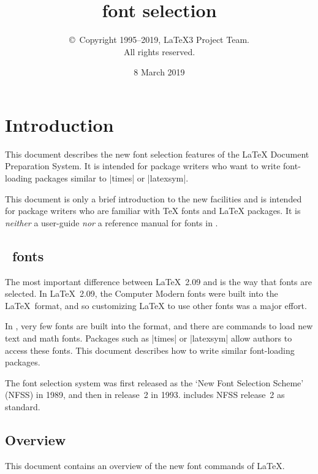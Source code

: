 \documentclass{ltxguide}[1995/11/28]
\title{\LaTeXe{} font selection}
\author{\copyright~Copyright 1995--2019, \LaTeX3 Project Team.\\
   All rights reserved.}
\date{8 March 2019}
\begin{document}
 
\maketitle
 
\tableofcontents
 
\section{Introduction}
 
This document describes the new font selection features of the \LaTeX{}
Document Preparation System.  It is intended for package writers who
want to write font-loading packages similar to |times| or |latexsym|.

This document is only a brief introduction to the new facilities and
is intended for package writers who are familiar with \TeX{} fonts and
\LaTeX{} packages.  It is \emph{neither} a user-guide \emph{nor} a
reference manual for fonts in \LaTeXe.
 
\subsection{\LaTeXe~fonts}
 
The most important difference between \LaTeX~2.09 and \LaTeXe{} is the
way that fonts are selected.  In \LaTeX~2.09, the Computer Modern fonts
were built into the \LaTeX~format, and so customizing \LaTeX{} to use
other fonts was a major effort.
 
In \LaTeXe, very few fonts are built into the format, and there are
commands to load new text and math fonts.  Packages such as |times| or
|latexsym| allow authors to access these fonts.
This document describes how to write similar font-loading packages.
 
The \LaTeXe{} font selection system was first released as the `New Font
Selection Scheme' (NFSS) in 1989, and then in release~2 in 1993.
\LaTeXe{} includes NFSS release~2 as standard.
 
\subsection{Overview}
 
This document contains an overview of the new font commands
of \LaTeX.
 
\end{document}

